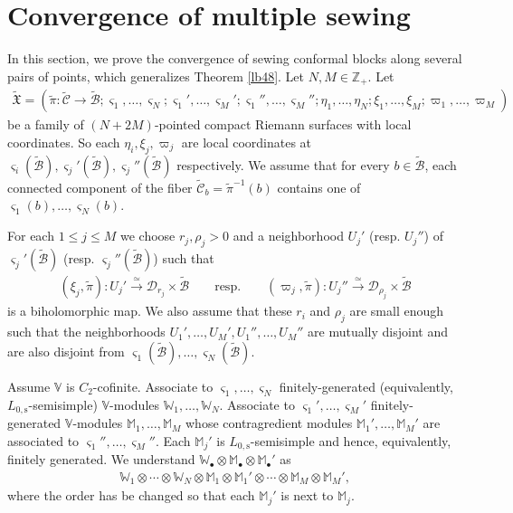 \documentclass[12pt,a4paper,notitlepage]{article}
\theoremstyle{definition}
\theoremstyle{plain}
\newcommand{\fk}{\mathfrak}
\newcommand{\mc}{\mathcal}
\newcommand{\wtd}{\widetilde}
\newcommand{\sgm}{\varsigma}
\newcommand{\blt}{\bullet}
\newcommand{\Vbb}{\mathbb V}
\newcommand{\Wbb}{\mathbb W}
\newcommand{\Mbb}{\mathbb M}
\newcommand{\Zbb}{\mathbb Z}
\newcommand{\Lss}{{L_{0,\mathrm{s}}}}
\numberwithin{equation}{section}
\begin{document}
\section{Convergence of multiple sewing}\label{lb56}


In this section, we prove the convergence of sewing conformal blocks along several pairs of points, which generalizes Theorem \ref{lb48}. Let $N,M\in\Zbb_+$. Let
\begin{align*}
\wtd{\fk X}=(\wtd\pi:\wtd{\mc C}\rightarrow\wtd{\mc B};\sgm_1,\dots,\sgm_N;\sgm_1',\dots,\sgm_M';\sgm_1'',\dots,\sgm_M'';\eta_1,\dots,\eta_N;\xi_1,\dots,\xi_M;\varpi_1,\dots,\varpi_M)
\end{align*}
be a family of $(N+2M)$-pointed compact Riemann surfaces with local coordinates. So each $\eta_i,\xi_j,\varpi_j$ are local coordinates at $\sgm_i(\wtd{\mc B}),\sgm_j'(\wtd{\mc B}),\sgm_j''(\wtd{\mc B})$ respectively. We assume that for every $b\in\wtd{\mc B}$, each connected component of the fiber  $\wtd{\mc C}_b=\wtd\pi^{-1}(b)$ contains one of $\sgm_1(b),\dots,\sgm_N(b)$.

For each $1\leq j\leq M$ we choose $r_j,\rho_j>0$ and a neighborhood $U_j'$ (resp. $U_j''$) of $\sgm_j'(\wtd {\mc B})$ (resp. $\sgm_j''(\wtd {\mc B})$) such that
\begin{gather}
(\xi_j,\wtd\pi):U_j'\xrightarrow{\simeq} \mc D_{r_j}\times\wtd{\mc B}\qquad\text{resp.}\qquad (\varpi_j,\wtd\pi):U_j''\xrightarrow{\simeq} \mc D_{\rho_j}\times\wtd{\mc B}\label{eq94}
\end{gather}
is a biholomorphic map. We also assume that these $r_i$ and $\rho_j$ are small enough such that the neighborhoods $U_1',\dots,U_M',U_1'',\dots,U_M''$ are mutually disjoint and are also disjoint from $\sgm_1(\wtd{\mc B}),\dots,\sgm_N(\wtd{\mc B})$. 




Assume $\Vbb$ is $C_2$-cofinite. Associate to $\sgm_1,\dots,\sgm_N$ finitely-generated (equivalently, $\Lss$-semisimple) $\Vbb$-modules $\Wbb_1,\dots,\Wbb_N$. Associate to $\sgm_1',\dots,\sgm_M'$ finitely-generated  $\Vbb$-modules $\Mbb_1,\dots,\Mbb_M$ whose contragredient modules $\Mbb_1',\dots,\Mbb_M'$ are associated to $\sgm_1'',\dots,\sgm_M''$. Each $\Mbb_j'$ is $\Lss$-semisimple and hence, equivalently, finitely generated.  We understand $\Wbb_\blt\otimes\Mbb_\blt\otimes\Mbb_\blt'$ as
\begin{align*}
\Wbb_1\otimes\cdots\otimes \Wbb_N\otimes\Mbb_1\otimes\Mbb_1'\otimes\cdots\otimes\Mbb_M\otimes\Mbb_M',
\end{align*}
where the order has be changed so that each $\Mbb_j'$ is next to $\Mbb_j$. 
\end{document}
